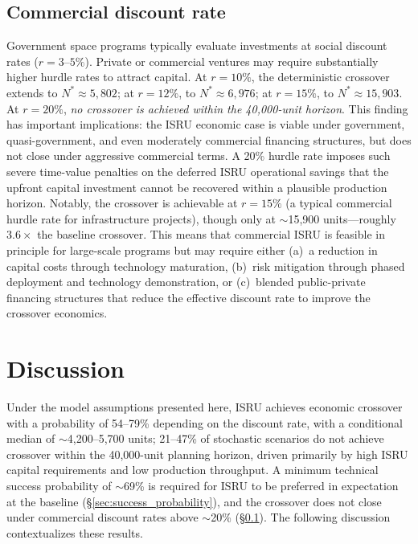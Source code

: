 \documentclass[preprint,12pt]{elsarticle}
\begin{document}
\subsection{Commercial discount rate}
\label{sec:commercial_rate}

Government space programs typically evaluate investments at social discount rates ($r = 3$--$5\%$). Private or commercial ventures may require substantially higher hurdle rates to attract capital. At $r = 10\%$, the deterministic crossover extends to $N^* \approx 5{,}802$; at $r = 12\%$, to $N^* \approx 6{,}976$; at $r = 15\%$, to $N^* \approx 15{,}903$. At $r = 20\%$, \emph{no crossover is achieved within the 40{,}000-unit horizon}. This finding has important implications: the ISRU economic case is viable under government, quasi-government, and even moderately commercial financing structures, but does not close under aggressive commercial terms. A 20\% hurdle rate imposes such severe time-value penalties on the deferred ISRU operational savings that the upfront capital investment cannot be recovered within a plausible production horizon. Notably, the crossover is achievable at $r = 15\%$ (a typical commercial hurdle rate for infrastructure projects), though only at $\sim$15{,}900 units---roughly $3.6\times$ the baseline crossover. This means that commercial ISRU is feasible in principle for large-scale programs but may require either (a)~a reduction in capital costs through technology maturation, (b)~risk mitigation through phased deployment and technology demonstration, or (c)~blended public-private financing structures that reduce the effective discount rate to improve the crossover economics.

\section{Discussion}
\label{sec:discussion}

Under the model assumptions presented here, ISRU achieves economic crossover with a probability of 54--79\% depending on the discount rate, with a conditional median of $\sim$4{,}200--5{,}700 units; 21--47\% of stochastic scenarios do not achieve crossover within the 40{,}000-unit planning horizon, driven primarily by high ISRU capital requirements and low production throughput. A minimum technical success probability of $\sim$69\% is required for ISRU to be preferred in expectation at the baseline (\S\ref{sec:success_probability}), and the crossover does not close under commercial discount rates above $\sim$20\% (\S\ref{sec:commercial_rate}). The following discussion contextualizes these results.
\end{document}
